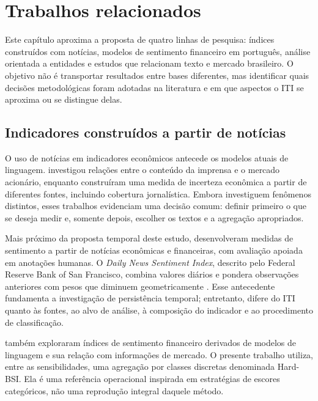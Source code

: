\chapter{Trabalhos relacionados}
\label{cap:relacionados}

Este capítulo aproxima a proposta de quatro linhas de pesquisa: índices construídos com notícias, modelos de sentimento financeiro em português, análise orientada a entidades e estudos que relacionam texto e mercado brasileiro. O objetivo não é transportar resultados entre bases diferentes, mas identificar quais decisões metodológicas foram adotadas na literatura e em que aspectos o ITI se aproxima ou se distingue delas.

\section{Indicadores construídos a partir de notícias}

O uso de notícias em indicadores econômicos antecede os modelos atuais de linguagem.  investigou relações entre o conteúdo da imprensa e o mercado acionário, enquanto  construíram uma medida de incerteza econômica a partir de diferentes fontes, incluindo cobertura jornalística. Embora investiguem fenômenos distintos, esses trabalhos evidenciam uma decisão comum: definir primeiro o que se deseja medir e, somente depois, escolher os textos e a agregação apropriados.

Mais próximo da proposta temporal deste estudo,  desenvolveram medidas de sentimento a partir de notícias econômicas e financeiras, com avaliação apoiada em anotações humanas. O \emph{Daily News Sentiment Index}, descrito pelo Federal Reserve Bank of San Francisco, combina valores diários e pondera observações anteriores com pesos que diminuem geometricamente \cite{buckman2020dnsi,frbsfNewsSentiment}. Esse antecedente fundamenta a investigação de persistência temporal; entretanto, difere do ITI quanto às fontes, ao alvo de análise, à composição do indicador e ao procedimento de classificação.

 também exploraram índices de sentimento financeiro derivados de modelos de linguagem e sua relação com informações de mercado. O presente trabalho utiliza, entre as sensibilidades, uma agregação por classes discretas denominada Hard-BSI. Ela é uma referência operacional inspirada em estratégias de escores categóricos, não uma reprodução integral daquele método.

